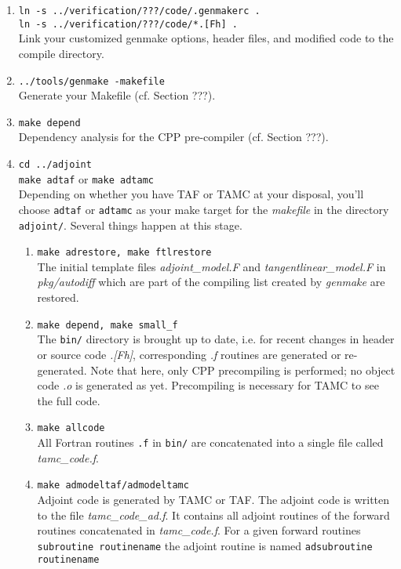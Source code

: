 \begin{enumerate}
%
\item
{\tt ln -s ../verification/???/code/.genmakerc .} \\
{\tt ln -s ../verification/???/code/*.[Fh] .} \\
Link your customized genmake options, header files,
and modified code to the compile directory.
%
\item
{\tt ../tools/genmake -makefile} \\
Generate your Makefile (cf. Section ???).
%
\item
{\tt make depend} \\
Dependency analysis for the CPP pre-compiler (cf. Section ???).
%
\item
{\tt cd ../adjoint} \\
{\tt make adtaf} or {\tt make adtamc} \\
Depending on whether you have TAF or TAMC at your disposal,
you'll choose {\tt adtaf} or {\tt adtamc} as your
make target for the {\it makefile} in the directory {\tt adjoint/}.
Several things happen at this stage.
%
\begin{enumerate}
%
\item
{\tt make adrestore, make ftlrestore} \\
The initial template files {\it adjoint\_model.F} 
and {\it tangentlinear\_model.F} in {\it pkg/autodiff}
which are part
of the compiling list created by {\it genmake} are restored.
%
\item {\tt make depend, make small\_f} \\
The {\tt bin/} directory is brought up to date,
i.e. for recent changes in header or source code
{\it .[Fh]}, corresponding {\it .f} routines are generated
or re-generated.
Note that here, only CPP precompiling is performed;
no object code {\it .o} is generated as yet.
Precompiling is necessary for TAMC to see the full code.
%
\item
{\tt make allcode} \\
All Fortran routines {\tt *.f} in {\tt bin/} are 
concatenated into a single file called
{\it tamc\_code.f}.
%
\item
{\tt make admodeltaf/admodeltamc} \\
Adjoint code is generated by TAMC or TAF.
The adjoint code is written to the file {\it tamc\_code\_ad.f}.
It contains all adjoint routines of the forward routines
concatenated in {\it tamc\_code.f}.
For a given forward routines {\tt subroutine routinename}
the adjoint routine is named {\tt adsubroutine routinename}

\end{enumerate}
\end{enumerate}
